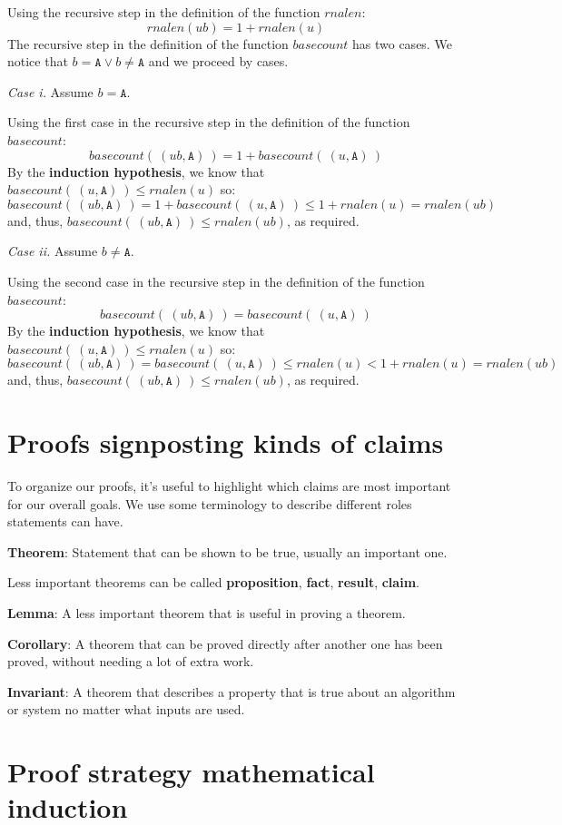 \documentclass[12pt, oneside]{article}
\newcommand{\A}[0]{\texttt{A}}
\begin{document}
Using the recursive step in the definition of the function $rnalen$:
\[
    rnalen(ub) = 1 + rnalen(u)
\]
The recursive step in the definition of the function $basecount$ has two cases. We notice that 
$b = \A \lor b \neq \A$ and we proceed by cases.

{\it Case i.} Assume $b = \A$.

Using the first case in the recursive step in the definition of the function $basecount$:
\[
    basecount(~(ub, \A)~) = 1 + basecount(~(u,\A)~)
\]
By the {\bf induction hypothesis}, we know that $basecount(~(u,\A)~) \leq rnalen(u)$ so:
\[
    basecount(~(ub, \A)~) = 1 + basecount(~(u,\A)~) \leq 1 + rnalen(u) = rnalen (ub)
\]
and, thus, $basecount(~(ub,\A)~) \leq rnalen(ub)$, as required.

{\it Case ii.} Assume $b \neq \A$. 

Using the second case in the recursive step in the definition of the function $basecount$:
\[
    basecount(~(ub, \A)~) = basecount(~(u,\A)~)
\]
By the {\bf induction hypothesis}, we know that $basecount(~(u,\A)~) \leq rnalen(u)$ so:
\[
    basecount(~(ub, \A)~) = basecount(~(u,\A)~) \leq rnalen(u) < 1 + rnalen(u) = rnalen (ub)
\]
and, thus, $basecount(~(ub,\A)~) \leq rnalen(ub)$, as required.
 \vfill
\section*{Proofs signposting kinds of claims}


To organize our proofs, it's useful to highlight which claims are most important for 
our overall goals.
We use some terminology to describe different roles statements can have.

{\bf Theorem}: Statement that can be shown to be true, usually an important one.

Less important theorems can be called {\bf proposition}, {\bf fact}, {\bf result}, {\bf claim}.

{\bf Lemma}: A less important theorem that is useful in proving a theorem.
 
{\bf Corollary}: A theorem that can be proved directly after another one has been proved, 
without needing a lot of extra work.

{\bf Invariant}: A theorem that describes a property that is true about an algorithm or 
system no matter what inputs are used.




 \vfill
\section*{Proof strategy mathematical induction}
\end{document}
